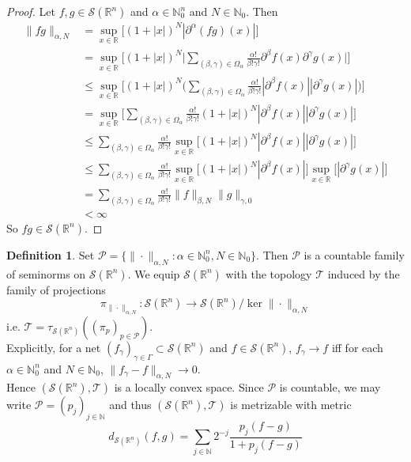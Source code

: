 \documentclass[12pt]{amsart}
\theoremstyle{definition}
\newtheorem{defn}[definition]{Definition}
\newcommand{\p}{\partial}
\newcommand{\al}{\alpha}
\newcommand{\be}{\beta}
\newcommand{\gam}{\gamma}
\newcommand{\Gam}{\Gamma}
\newcommand{\Om}{\Omega}
\newcommand{\N}{\mathbb{N}}
\newcommand{\R}{\mathbb{R}}
\newcommand{\MS}{\mathcal{S}}
\newcommand{\MP}{\mathcal{P}}
\newcommand{\MT}{\mathcal{T}}
\begin{document}
	\begin{proof}
		Let $f,g \in \MS(\R^n)$ and $\al \in \N_0^n$ and $N \in  \N_0$. Then 
		\begin{align*}
			\|fg\|_{\al, N}
			& = \sup_{x \in \R} \bigg[ (1 + |x|)^N|\p^{\al}(fg)(x)| \bigg] \\
			& = \sup_{x \in \R} \bigg[ (1 + |x|)^N \bigg | \sum\limits_{(\be, \gam) \in \Om_{\al}} \frac{\al!}{\be! \gam!}\p^{\be}f (x) \p^{\gam}g (x) \bigg|  \bigg] \\
			& \leq \sup_{x \in \R} \bigg[ (1 + |x|)^N \bigg(\sum\limits_{(\be, \gam) \in \Om_{\al}} \frac{\al!}{\be! \gam!}|\p^{\be}f (x)| |\p^{\gam}g (x)| \bigg) \bigg] \\
			& = \sup_{x \in \R} \bigg[   \sum\limits_{(\be, \gam) \in \Om_{\al}} \frac{\al!}{\be! \gam!} (1 + |x|)^N|\p^{\be}f(x)| |\p^{\gam}g (x)| \bigg] \\
			& \leq \sum\limits_{(\be, \gam) \in \Om_{\al}} \frac{\al!}{\be! \gam!} \sup_{x \in \R} \bigg[ (1 + |x|)^N|\p^{\be}f(x)| |\p^{\gam}g (x)| \bigg] \\
			& \leq \sum\limits_{(\be, \gam) \in \Om_{\al}} \frac{\al!}{\be! \gam!} \sup_{x \in \R} \bigg[ (1 + |x|)^N|\p^{\be}f(x)| \bigg]  \sup_{x \in \R} \bigg[|\p^{\gam}g (x) | \bigg] \\
			& = \sum\limits_{(\be, \gam) \in \Om_{\al}} \frac{\al!}{\be! \gam!}  \|f\|_{\be, N} \|g\|_{\gam, 0} \\
			& < \infty
		\end{align*} 
		So $fg \in \MS(\R^n)$.
	\end{proof}

	\begin{defn}
		Set $\MP = \{\|\cdot\|_{\al, N}: \al \in \N_0^n, N \in \N_0 \}$. Then $\MP$ is a countable family of seminorms on $\MS(\R^n)$. We equip $\MS(\R^n)$ with the topology $\MT$ induced by the family of projections $$\pi_{\| \cdot \|_{\al,N}}: \MS(\R^n) \rightarrow \MS(\R^n) / \ker \|\cdot\|_{\al,N} $$ 
		i.e. $\MT = \tau_{\MS(\R^n)}((\pi_{p})_{p \in \MP})$.  \\
		Explicitly, for a net $(f_{\gam})_{\gam \in \Gam} \subset \MS(\R^n)$ and $f \in \MS(\R^n)$, $f_{\gam} \rightarrow f$ iff for each $\al \in \N_0^n$ and $N \in  \N_0$, $\|f_{\gam} - f\|_{\al, N} \rightarrow 0$. \\
		Hence $(\MS(\R^n), \MT)$ is a locally convex space. Since $\MP$ is countable, we may write $\MP = (p_j)_{j \in \N}$ and thus $(\MS(\R^n), \MT)$ is metrizable with metric
		$$d_{\MS(\R^n)}(f,g) = \sum_{j \in \N} 2^{-j} \frac{p_j(f-g)}{1 + p_j(f-g)}$$
	\end{defn}
\end{document}
